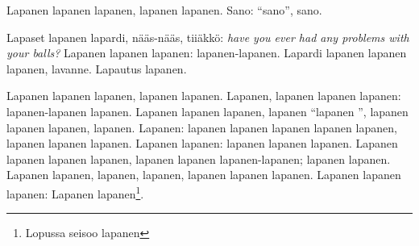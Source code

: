 \documentclass[a4paper]{article}
\begin{document}
\begin{multicols}{2}
Lapanen lapanen lapanen, lapanen lapanen. Sano: ``sano'', sano.

Lapaset lapanen lapardi, nääs-nääs, tiiäkkö: \textit{have you ever had any problems with your balls?} Lapanen lapanen
lapanen: lapanen-lapanen. Lapardi lapanen lapanen lapanen, lavanne. Lapautus lapanen.

Lapanen lapanen lapanen, lapanen lapanen. Lapanen, lapanen lapanen lapanen: lapanen-lapanen lapanen. Lapanen lapanen
lapanen, lapanen ``lapanen '', lapanen lapanen lapanen, lapanen. Lapanen: lapanen lapanen lapanen lapanen lapanen,
lapanen lapanen lapanen. Lapanen lapanen: lapanen lapanen lapanen. Lapanen lapanen lapanen lapanen, lapanen lapanen
lapanen-lapanen; lapanen lapanen. Lapanen lapanen, lapanen, lapanen, lapanen lapanen lapanen.
Lapanen lapanen lapanen: Lapanen lapanen\footnote{Lopussa seisoo lapanen}.


\printbibliography[title={Lapautteet}]

\end{multicols}
\end{document}
